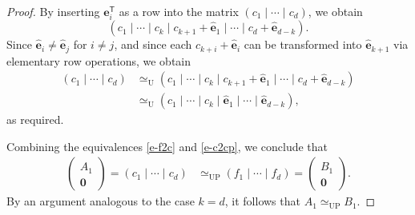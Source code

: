 \documentclass[10pt,a4paper]{amsart}
\begin{document}
\begin{proof}
By inserting $\mathbf{e}_i^\mathsf{T}$ as a row into the matrix $(c_1 \mid \cdots \mid c_d)$, we obtain
\[
(c_1 \mid \cdots \mid c_k \mid c_{k+1} + \widehat{\mathbf{e}}_1 \mid \cdots \mid c_d + \widehat{\mathbf{e}}_{d-k}).
\]
Since $\widehat{\mathbf{e}}_i \neq \widehat{\mathbf{e}}_j$ for $i \neq j$, and since each $c_{k+i} + \widehat{\mathbf{e}}_i$ can be transformed into $\widehat{\mathbf{e}}_{k+1}$ via elementary row operations, we obtain
\begin{align*}
(c_1 \mid \cdots \mid c_d) &\simeq_{\mathrm{U}} (c_1 \mid \cdots \mid c_k \mid c_{k+1} + \widehat{\mathbf{e}}_1 \mid \cdots \mid c_d + \widehat{\mathbf{e}}_{d-k}) \\
&\simeq_{\mathrm{U}} (c_1 \mid \cdots \mid c_k \mid \widehat{\mathbf{e}}_1 \mid \cdots \mid \widehat{\mathbf{e}}_{d-k}),
\end{align*}
as required.

Combining the equivalences \eqref{e-f2c} and \eqref{e-c2cp}, we conclude that
\begin{align}
\label{e-cf}
\begin{pmatrix} A_1 \\ \mathbf{0} \end{pmatrix}
= (c_1 \mid \cdots \mid c_d) &\simeq_{\mathrm{UP}} (f_1 \mid \cdots \mid f_d) = \begin{pmatrix} B_1 \\ \mathbf{0} \end{pmatrix}.
\end{align}
By an argument analogous to the case $k = d$, it follows that $A_1 \simeq_{\mathrm{UP}} B_1$.
\end{proof}
\end{document}
